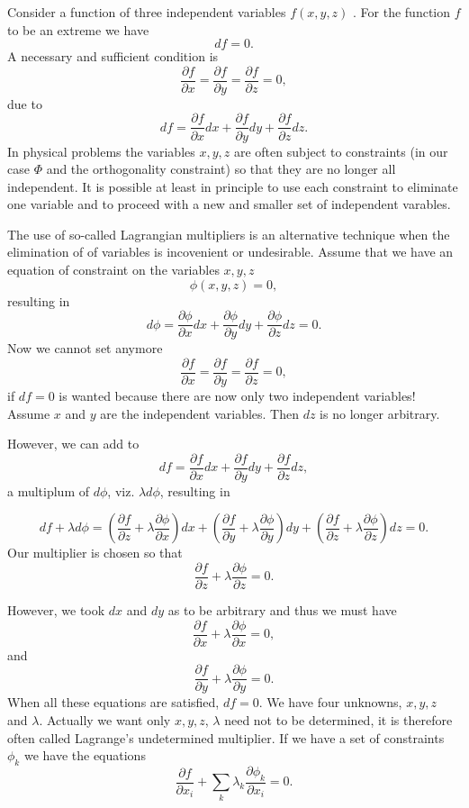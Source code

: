 Consider a function of three independent variables $f(x,y,z)$ . For the function $f$ to be an 
extreme we have
\[
df=0.
\]
A necessary and sufficient condition is
\[
\frac{\partial f}{\partial x} =\frac{\partial f}{\partial y}=\frac{\partial f}{\partial z}=0,
\]
due to 
\[
df = \frac{\partial f}{\partial x}dx+\frac{\partial f}{\partial y}dy+\frac{\partial f}{\partial z}dz.
\]
In physical problems the variables $x,y,z$ are often subject to constraints (in our case $\Phi$ and the orthogonality constraint)
so that they are no longer all independent. It is possible at least in principle to use each constraint to eliminate one variable
and to proceed with a new and smaller set of independent varables.

The use of so-called Lagrangian  multipliers is an alternative technique  when the elimination of
of variables is incovenient or undesirable.  Assume that we have an equation of constraint on the variables $x,y,z$
\[
\phi(x,y,z) = 0,
\]
 resulting in
\[
d\phi = \frac{\partial \phi}{\partial x}dx+\frac{\partial \phi}{\partial y}dy+\frac{\partial \phi}{\partial z}dz =0.
\]
Now we cannot set anymore 
\[
\frac{\partial f}{\partial x} =\frac{\partial f}{\partial y}=\frac{\partial f}{\partial z}=0,
\]
if $df=0$ is wanted 
because there are now only two independent variables!  Assume $x$ and $y$ are the independent variables.
Then $dz$ is no longer arbitrary. 

However, we can add to
\[
df = \frac{\partial f}{\partial x}dx+\frac{\partial f}{\partial y}dy+\frac{\partial f}{\partial z}dz,
\]
a multiplum of $d\phi$, viz. $\lambda d\phi$, resulting  in

\[
df+\lambda d\phi = (\frac{\partial f}{\partial z}+\lambda\frac{\partial \phi}{\partial x})dx+(\frac{\partial f}{\partial y}+\lambda\frac{\partial \phi}{\partial y})dy+
(\frac{\partial f}{\partial z}+\lambda\frac{\partial \phi}{\partial z})dz =0.
\]
Our multiplier is chosen so that
\[
\frac{\partial f}{\partial z}+\lambda\frac{\partial \phi}{\partial z} =0.
\]

However, we took $dx$ and $dy$ as to be arbitrary and thus we must have
\[
\frac{\partial f}{\partial x}+\lambda\frac{\partial \phi}{\partial x} =0,
\]
and
\[
\frac{\partial f}{\partial y}+\lambda\frac{\partial \phi}{\partial y} =0.
\]
When all these equations are satisfied, $df=0$.  We have four unknowns, $x,y,z$ and
$\lambda$. Actually we want only $x,y,z$, $\lambda$ need not to be determined, it is therefore often called
Lagrange's undetermined multiplier. 
If we have a set of constraints $\phi_k$ we have the equations
\[
\frac{\partial f}{\partial x_i}+\sum_k\lambda_k\frac{\partial \phi_k}{\partial x_i} =0.
\]


